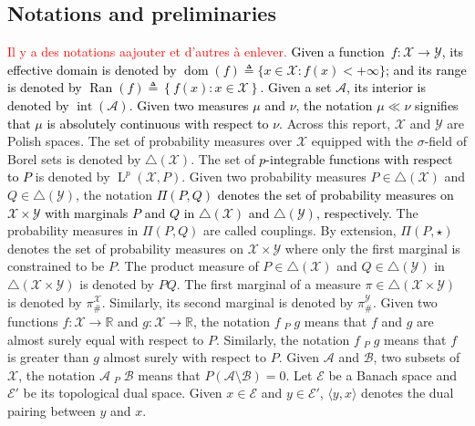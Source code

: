 \documentclass[twoside]{article}
\newcommand{\R}{\mathbb{R}}
\newcommand{\eqas}[1]{\displaystyle\mathop{ \stackrel{a.s.}{=}}_{#1}}
\newcommand{\geqas}[1]{\displaystyle\mathop{ \stackrel{a.s.}{\geq}}_{#1}}
\newcommand{\subsetas}[1]{\displaystyle\mathop{ \stackrel{a.s.}{\subset}}_{#1}}
\begin{document}
\subsection{Notations and preliminaries}
\textcolor{red}{Il y a des notations aajouter et d'autres à enlever.}
\textcolor{black}{Given a  function~$f: \mathcal{X} \to \mathcal{Y}$, its effective domain is denoted by  $\operatorname{dom}(f) \triangleq \{x \in \mathcal{X}: f(x) < +\infty\}$; and its range is denoted by $\operatorname{Ran}(f) \triangleq \left\lbrace f(x) : x \in \mathcal{X} \right\rbrace$. Given a set $\mathcal{A}$, its interior is denoted by $\operatorname{int}(\mathcal A)$. 
Given two measures $\mu$ and $\nu$, the notation $\mu \ll \nu$ signifies that $\mu$ is absolutely continuous with respect to $\nu$.} Across this report, $\mathcal{X}$ and $\mathcal{Y}$ are Polish spaces.
The set of probability measures over $\mathcal{X}$ equipped with the $\sigma$-field of Borel sets is denoted by $\triangle(\mathcal{X})$.
The set of \textcolor{black}{$p$-integrable functions with respect to $P$} is denoted by $\operatorname{L}^p(\mathcal{X},P)$.
Given two probability measures $P \in \triangle(\mathcal{X})$ and $Q \in \triangle(\mathcal{Y})$, the notation \textcolor{black}{$\Pi(P,Q)$ denotes the set of probability measures on $\mathcal{X}\times \mathcal{Y}$ with marginals $P$ and $Q$ in $\triangle(\mathcal{X})$ and $\triangle(\mathcal{Y})$, respectively.} The probability measures in $\Pi(P,Q)$ are called couplings. By extension, $\Pi(P, \star)$ denotes the set of probability measures on $\mathcal{X} \times \mathcal{Y}$ where only the first marginal is constrained to be $P$. The product measure of $P \in \triangle(\mathcal{X})$ and $Q \in \triangle(\mathcal{Y})$ in $\triangle(\mathcal{X}\times\mathcal{Y})$ is denoted by $PQ$. The first marginal of a measure $\pi \in \triangle(\mathcal X \times \mathcal Y)$ is denoted by $\pi_{\#}^{\mathcal{X}}$. Similarly, its second marginal is denoted by $\pi_{\#}^{\mathcal{Y}}$. Given two functions $f : \mathcal{X}\to\R$ and $g : \mathcal{X}\to\R$, the notation $f \eqas{P} g$ means that $f$ and $g$ are almost surely equal with respect to $P$. Similarly, the notation $f \geqas{P} g$ means that $f$ is greater than $g$ almost surely with respect to $P$. Given $\mathcal A$ and $\mathcal B$, two subsets of $\mathcal{X}$, the notation  $\mathcal A \subsetas{P} \mathcal{B}$ means that $P(\mathcal A \setminus \mathcal B) = 0$. Let $\mathcal E$ be a Banach space and $\mathcal E'$ be its topological dual space.
Given $x \in \mathcal E $ and $y \in \mathcal E'$, $\langle y,x \rangle$ denotes the dual pairing between $y$ and $x$.
\end{document}
